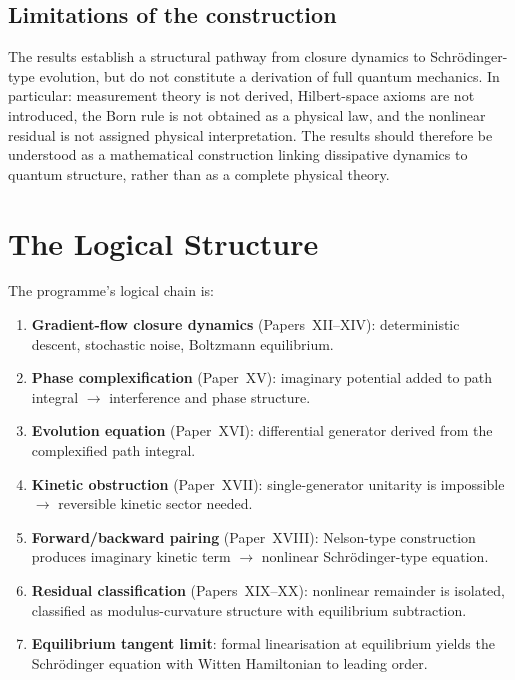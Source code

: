 \documentclass[12pt]{article}
\begin{document}
\subsection*{Limitations of the construction}

The results establish a structural pathway from closure dynamics to Schr\"odinger-type evolution, but do not constitute a derivation of full quantum mechanics. In particular: measurement theory is not derived, Hilbert-space axioms are not introduced, the Born rule is not obtained as a physical law, and the nonlinear residual is not assigned physical interpretation. The results should therefore be understood as a mathematical construction linking dissipative dynamics to quantum structure, rather than as a complete physical theory.

\section{The Logical Structure}\label{sec:logic}

The programme's logical chain is:
\begin{enumerate}
    \item \textbf{Gradient-flow closure dynamics} (Papers~XII--XIV): deterministic descent, stochastic noise, Boltzmann equilibrium.
    \item \textbf{Phase complexification} (Paper~XV): imaginary potential added to path integral $\rightarrow$ interference and phase structure.
    \item \textbf{Evolution equation} (Paper~XVI): differential generator derived from the complexified path integral.
    \item \textbf{Kinetic obstruction} (Paper~XVII): single-generator unitarity is impossible $\rightarrow$ reversible kinetic sector needed.
    \item \textbf{Forward/backward pairing} (Paper~XVIII): Nelson-type construction produces imaginary kinetic term $\rightarrow$ nonlinear Schr\"odinger-type equation.
    \item \textbf{Residual classification} (Papers~XIX--XX): nonlinear remainder is isolated, classified as modulus-curvature structure with equilibrium subtraction.
    \item \textbf{Equilibrium tangent limit}: formal linearisation at equilibrium yields the Schr\"odinger equation with Witten Hamiltonian to leading order.
\end{enumerate}
\end{document}
